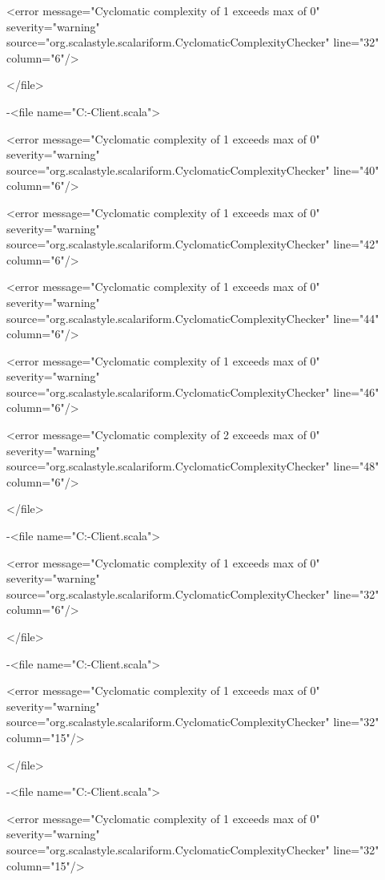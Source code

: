\documentclass{scalatekids-article}
\begin{document}
<error message="Cyclomatic complexity of 1 exceeds max of 0" severity="warning" source="org.scalastyle.scalariform.CyclomaticComplexityChecker" line="32" column="6"/>

</file>


-<file name="C:\Users\Davide\Documents\GitHub\Actorbase-Client\src\main\scala\com\actorbase\cli\models\Observable.scala">

<error message="Cyclomatic complexity of 1 exceeds max of 0" severity="warning" source="org.scalastyle.scalariform.CyclomaticComplexityChecker" line="40" column="6"/>

<error message="Cyclomatic complexity of 1 exceeds max of 0" severity="warning" source="org.scalastyle.scalariform.CyclomaticComplexityChecker" line="42" column="6"/>

<error message="Cyclomatic complexity of 1 exceeds max of 0" severity="warning" source="org.scalastyle.scalariform.CyclomaticComplexityChecker" line="44" column="6"/>

<error message="Cyclomatic complexity of 1 exceeds max of 0" severity="warning" source="org.scalastyle.scalariform.CyclomaticComplexityChecker" line="46" column="6"/>

<error message="Cyclomatic complexity of 2 exceeds max of 0" severity="warning" source="org.scalastyle.scalariform.CyclomaticComplexityChecker" line="48" column="6"/>

</file>


-<file name="C:\Users\Davide\Documents\GitHub\Actorbase-Client\src\main\scala\com\actorbase\cli\views\ActorbaseBanner.scala">

<error message="Cyclomatic complexity of 1 exceeds max of 0" severity="warning" source="org.scalastyle.scalariform.CyclomaticComplexityChecker" line="32" column="6"/>

</file>


-<file name="C:\Users\Davide\Documents\GitHub\Actorbase-Client\src\main\scala\com\actorbase\cli\models\ListCollectionsCommand.scala">

<error message="Cyclomatic complexity of 1 exceeds max of 0" severity="warning" source="org.scalastyle.scalariform.CyclomaticComplexityChecker" line="32" column="15"/>

</file>


-<file name="C:\Users\Davide\Documents\GitHub\Actorbase-Client\src\main\scala\com\actorbase\cli\models\ResetPasswordCommand.scala">

<error message="Cyclomatic complexity of 1 exceeds max of 0" severity="warning" source="org.scalastyle.scalariform.CyclomaticComplexityChecker" line="32" column="15"/>
\end{document}
